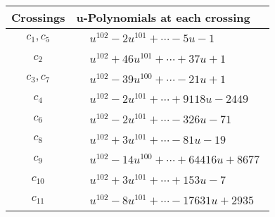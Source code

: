 \documentclass[1p]{elsarticle_modified}
\theoremstyle{definition}
\begin{document}
\begin{tabular}{m{50pt}|m{274pt}}
Crossings & \hspace{64pt}u-Polynomials at each crossing \\
\hline $$\begin{aligned}c_{1},c_{5}\end{aligned}$$&$\begin{aligned}
&u^{102}-2 u^{101}+\cdots-5 u-1
\end{aligned}$\\
\hline $$\begin{aligned}c_{2}\end{aligned}$$&$\begin{aligned}
&u^{102}+46 u^{101}+\cdots+37 u+1
\end{aligned}$\\
\hline $$\begin{aligned}c_{3},c_{7}\end{aligned}$$&$\begin{aligned}
&u^{102}-39 u^{100}+\cdots-21 u+1
\end{aligned}$\\
\hline $$\begin{aligned}c_{4}\end{aligned}$$&$\begin{aligned}
&u^{102}-2 u^{101}+\cdots+9118 u-2449
\end{aligned}$\\
\hline $$\begin{aligned}c_{6}\end{aligned}$$&$\begin{aligned}
&u^{102}-2 u^{101}+\cdots-326 u-71
\end{aligned}$\\
\hline $$\begin{aligned}c_{8}\end{aligned}$$&$\begin{aligned}
&u^{102}+3 u^{101}+\cdots-81 u-19
\end{aligned}$\\
\hline $$\begin{aligned}c_{9}\end{aligned}$$&$\begin{aligned}
&u^{102}-14 u^{100}+\cdots+64416 u+8677
\end{aligned}$\\
\hline $$\begin{aligned}c_{10}\end{aligned}$$&$\begin{aligned}
&u^{102}+3 u^{101}+\cdots+153 u-7
\end{aligned}$\\
\hline $$\begin{aligned}c_{11}\end{aligned}$$&$\begin{aligned}
&u^{102}-8 u^{101}+\cdots-17631 u+2935
\end{aligned}$\\
\hline
\end{tabular}\\~\\
\end{document}

